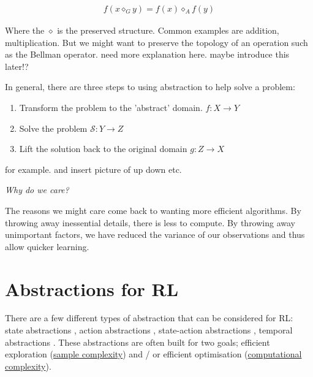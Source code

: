 \begin{align*}
f(x \diamond_G y) = f(x) \diamond_A f(y)
\end{align*}

Where the $\diamond$ is the preserved structure.
Common examples are addition, multiplication.
But we might want to preserve the topology of an operation such as the Bellman operator.
{\color{red}need more explanation here. maybe introduce this later!?}

In general, there are three steps to using abstraction to help solve a problem:

\begin{enumerate}
\tightlist
  \item Transform the problem to the 'abstract' domain. $f: X\to Y$
  \item Solve the problem $\mathcal S: Y \to Z$
  \item Lift the solution back to the original domain  $g:Z \to X$
\end{enumerate}

{\color{red}for example. and insert picture of up down etc.}

\begin{displayquote}
 \textit{Why do we care?}
\end{displayquote}

The reasons we might care come back to wanting more efficient algorithms.
By throwing away inessential details, there is less to compute.
By throwing away unimportant factors, we have reduced the variance of our
observations and thus allow quicker learning. \footnotemark[12]

%

\section{Abstractions for RL}


There are a few different types of abstraction that can be considered for RL:
state abstractions \cite{Anand2019, Littman2006,Haarnoja,Cuccu2018,Zhonga,Vezzani2019,Abel2018,Duan2018,Abel2017,Silver2016a},
action abstractions \cite{Chandak2019,Bester2019,Tennenholtz2019,Nagabandi2019}, state-action abstractions \cite{Dayan1993,Barreto2017}, temporal abstractions \cite{Christodoulou2019, Rafati,Mankowitz2018,Harutyunyan2017,Fruit2017,Riemer2018,Bacon2018,Achiam2018,Pham2019,Konidaris2018,Haarnoja,Sutton1999,Fruit2017a,Bacon2016a,Jinnai2018,Nachum2018}.
These abstractions are often built for two goals; efficient exploration
(\href{https://en.wikipedia.org/wiki/Sample_complexity}{sample complexity})
and / or efficient optimisation (\href{https://en.wikipedia.org/wiki/Computational_complexity_theory}{computational complexity}).

